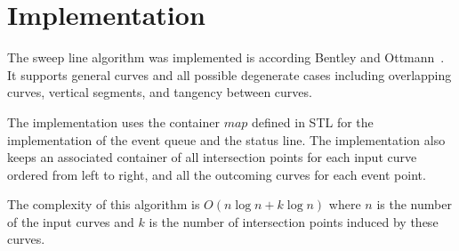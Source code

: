 \section{Implementation}

The sweep line algorithm was implemented is according 
Bentley and Ottmann~\cite{bkos-cgaa-97}. It supports general 
curves and all 
possible degenerate cases including overlapping curves, vertical segments, 
and tangency between curves.

The implementation uses the container $map$ defined in STL for
the implementation of the event queue and the status line. The implementation
also keeps an associated container of all 
intersection points for each input curve ordered from left to right, 
and all the outcoming curves for each event point. 

The complexity of this algorithm is $O(n\log{n} + k\log{n})$ where $n$ is the 
number of the input curves and $k$ is the number of intersection points 
induced by these curves.
